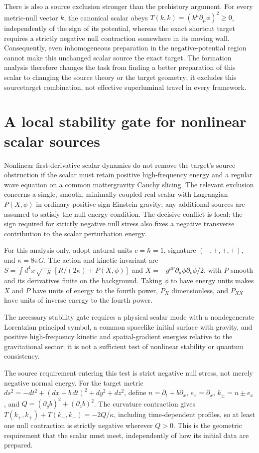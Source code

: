 \documentclass[11pt]{article}
\begin{document}
There is also a source exclusion stronger than the prehistory argument. For every metric-null vector $k$, the canonical scalar obeys $T(k,k)=(k^\mu\partial_\mu\phi)^2\geq0$, independently of the sign of its potential, whereas the exact shortcut target requires a strictly negative null contraction somewhere in its moving wall. Consequently, even inhomogeneous preparation in the negative-potential region cannot make this unchanged scalar source the exact target. The formation analysis therefore changes the task from finding a better preparation of this scalar to changing the source theory or the target geometry; it excludes this source\textendash{}\allowbreak{}target combination, not effective superluminal travel in every framework.

\section{A local stability gate for nonlinear scalar sources}
Nonlinear first-derivative scalar dynamics do not remove the target\textquoteright{}s source obstruction if the scalar must retain positive high-frequency energy and a regular wave equation on a common matter\textendash{}\allowbreak{}gravity Cauchy slicing. The relevant exclusion concerns a single, smooth, minimally coupled real scalar with Lagrangian $P(X,\phi)$ in ordinary positive-sign Einstein gravity; any additional sources are assumed to satisfy the null energy condition. The decisive conflict is local: the sign required for strictly negative null stress also fixes a negative transverse contribution to the scalar perturbation energy.

For this analysis only, adopt natural units $c=\hbar=1$, signature $(-,+,+,+)$, and $\kappa=8\pi G$. The action and kinetic invariant are $S=\int d^4x\,\sqrt{-g}\,[R/(2\kappa)+P(X,\phi)]$ and $X=-g^{\mu\nu}\partial_\mu\phi\partial_\nu\phi/2$, with $P$ smooth and its derivatives finite on the background. Taking $\phi$ to have energy units makes $X$ and $P$ have units of energy to the fourth power, $P_X$ dimensionless, and $P_{XX}$ have units of inverse energy to the fourth power.

The necessary stability gate requires a physical scalar mode with a nondegenerate Lorentzian principal symbol, a common spacelike initial surface with gravity, and positive high-frequency kinetic and spatial-gradient energies relative to the gravitational sector; it is not a sufficient test of nonlinear stability or quantum consistency.

The source requirement entering this test is strict negative null stress, not merely negative normal energy. For the target metric $ds^2=-dt^2+(dx-b\,dt)^2+dy^2+dz^2$, define $n=\partial_t+b\partial_x$, $e_x=\partial_x$, $k_\pm=n\pm e_x$, and $Q=(\partial_y b)^2+(\partial_z b)^2$. The curvature contraction gives $T(k_+,k_+)+T(k_-,k_-)=-2Q/\kappa$, including time-dependent profiles, so at least one null contraction is strictly negative wherever $Q>0$. This is the geometric requirement that the scalar must meet, independently of how its initial data are prepared.
\end{document}
